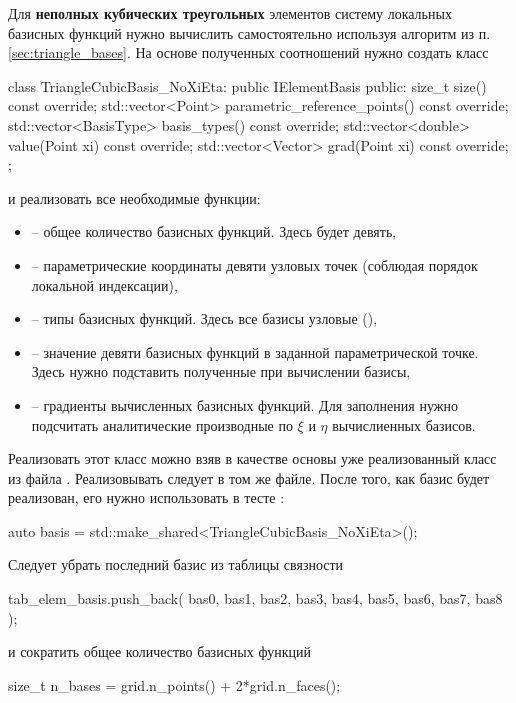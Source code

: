 Для {\bf неполных кубических треугольных} элементов систему локальных базисных функций нужно
вычислить самостоятельно используя алгоритм из п.\ref{sec:triangle_bases}.
На основе полученных соотношений нужно создать класс
\begin{cppcode}
class TriangleCubicBasis_NoXiEta: public IElementBasis{
public:
	size_t size() const override;
	std::vector<Point> parametric_reference_points() const override;
	std::vector<BasisType> basis_types() const override;
	std::vector<double> value(Point xi) const override;
	std::vector<Vector> grad(Point xi) const override;
};
\end{cppcode}
и реализовать все необходимые функции:
\begin{itemize}
\item {} -- общее количество базисных функций. Здесь будет девять,
\item {} -- параметрические координаты девяти узловых точек (соблюдая порядок локальной индексации),
\item {} -- типы базисных функций. Здесь все базисы узловые (),
\item {} -- значение девяти базисных функций в заданной параметрической точке. Здесь нужно подставить полученные при вычислении базисы,
\item {} -- градиенты вычисленных базисных функций. Для заполнения нужно подсчитать аналитические производные по $\xi$ и $\eta$ вычислиенных базисов.
\end{itemize}
Реализовать этот класс можно взяв в качестве основы уже реализованный класс  из файла . Реализовывать следует в том же файле.
После того, как базис будет реализован, его нужно использовать в тесте :
\begin{cppcode}
auto basis = std::make_shared<TriangleCubicBasis_NoXiEta>();
\end{cppcode}
Следует убрать последний базис из таблицы связности
\begin{cppcode}
tab_elem_basis.push_back({
	bas0, bas1, bas2,
	bas3, bas4, bas5, bas6, bas7, bas8
});
\end{cppcode}
и сократить общее количество базисных функций
\begin{cppcode}
size_t n_bases = grid.n_points() + 2*grid.n_faces();
\end{cppcode}

